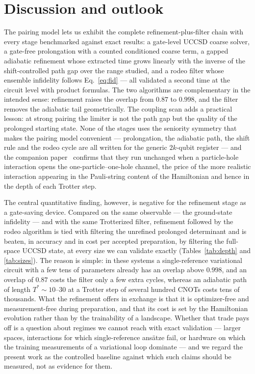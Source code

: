 \documentclass[
  aps,            %
  prc,            %
  reprint,        %
  superscriptaddress,
  floatfix,
  nofootinbib
]{revtex4-2}
\begin{document}
\section{Discussion and outlook}
\label{sec:discussion}
The pairing model lets us exhibit the complete refinement-plus-filter chain
with every stage benchmarked against exact results: a gate-level UCCSD coarse
solver, a gate-free prolongation with a counted conditioned coarse term, a
gapped adiabatic refinement whose extracted time grows linearly with the
inverse of the shift-controlled path gap over the range studied, and a rodeo
filter whose ensemble infidelity follows Eq.~\eqref{eq:fid} --- all validated
a second time at the circuit level with product formulas.  The two algorithms
are complementary in the intended sense: refinement raises the overlap from
$0.87$ to $0.998$, and the filter removes the adiabatic tail geometrically.
The coupling scan adds a practical lesson: at strong pairing the limiter is
not the path gap but the quality of the prolonged starting state.  None of
the stages uses the seniority symmetry that makes the pairing model
convenient --- prolongation, the adiabatic path, the shift rule and the rodeo
cycle are all written for the generic $2k$-qubit register --- and the
companion paper~\cite{PHcompanion} confirms that they run unchanged when a
particle-hole interaction opens the one-particle--one-hole channel, the price
of the more realistic interaction appearing in the Pauli-string content of
the Hamiltonian and hence in the depth of each Trotter step.

The central quantitative finding, however, is negative for the refinement
stage as a gate-saving device.  Compared on the same observable --- the
ground-state infidelity --- and with the same Trotterized filter, refinement
followed by the rodeo algorithm is tied with filtering the unrefined prolonged
determinant and is beaten, in accuracy and in cost per accepted preparation,
by filtering the full-space UCCSD state, at every size we can validate exactly
(Tables~\ref{tab:depth} and \ref{tab:sizes}).  The reason is
simple: in these systems a single-reference variational circuit with a few
tens of parameters already has an overlap above $0.998$, and an overlap of
$0.87$ costs the filter only a few extra cycles, whereas an adiabatic path of
length $T^{*}\sim10$--$30$ at a Trotter step of several hundred CNOTs costs
tens of thousands.  What the refinement offers in exchange is that it is
optimizer-free and measurement-free during preparation, and that its cost is
set by the Hamiltonian evolution rather than by the trainability of a
landscape.  Whether that trade pays off is a question about regimes we cannot
reach with exact validation --- larger spaces, interactions for which
single-reference ans\"atze fail, or hardware on which the training
measurements of a variational loop dominate --- and we regard the present
work as the controlled baseline against which such claims should be measured,
not as evidence for them.
\end{document}
